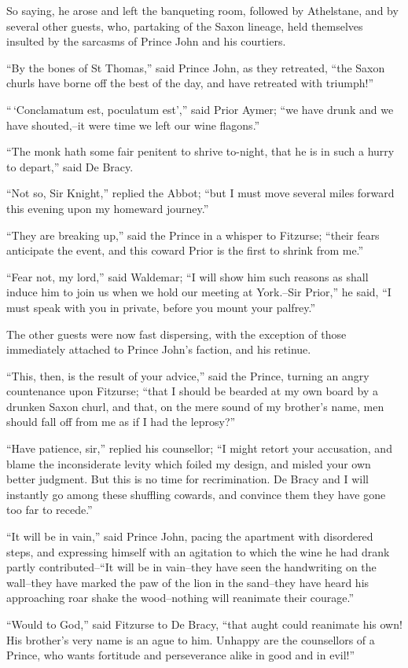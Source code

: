 So saying, he arose and left the banqueting room, followed by
Athelstane, and by several other guests, who, partaking of the Saxon
lineage, held themselves insulted by the sarcasms of Prince John and his
courtiers.

``By the bones of St Thomas,'' said Prince John, as they retreated,
``the Saxon churls have borne off the best of the day, and have
retreated with triumph!''

``\,`Conclamatum est, poculatum est','' said Prior Aymer; ``we have
drunk and we have shouted,--it were time we left our wine flagons.''

``The monk hath some fair penitent to shrive to-night, that he is in
such a hurry to depart,'' said De Bracy.

``Not so, Sir Knight,'' replied the Abbot; ``but I must move several
miles forward this evening upon my homeward journey.''

``They are breaking up,'' said the Prince in a whisper to Fitzurse;
``their fears anticipate the event, and this coward Prior is the first
to shrink from me.''

``Fear not, my lord,'' said Waldemar; ``I will show him such reasons as
shall induce him to join us when we hold our meeting at York.--Sir
Prior,'' he said, ``I must speak with you in private, before you mount
your palfrey.''

The other guests were now fast dispersing, with the exception of those
immediately attached to Prince John's faction, and his retinue.

``This, then, is the result of your advice,'' said the Prince, turning
an angry countenance upon Fitzurse; ``that I should be bearded at my own
board by a drunken Saxon churl, and that, on the mere sound of my
brother's name, men should fall off from me as if I had the leprosy?''

``Have patience, sir,'' replied his counsellor; ``I might retort your
accusation, and blame the inconsiderate levity which foiled my design,
and misled your own better judgment. But this is no time for
recrimination. De Bracy and I will instantly go among these shuffling
cowards, and convince them they have gone too far to recede.''

``It will be in vain,'' said Prince John, pacing the apartment with
disordered steps, and expressing himself with an agitation to which the
wine he had drank partly contributed--``It will be in vain--they have
seen the handwriting on the wall--they have marked the paw of the lion
in the sand--they have heard his approaching roar shake the
wood--nothing will reanimate their courage.''

``Would to God,'' said Fitzurse to De Bracy, ``that aught could
reanimate his own! His brother's very name is an ague to him. Unhappy
are the counsellors of a Prince, who wants fortitude and perseverance
alike in good and in evil!''
